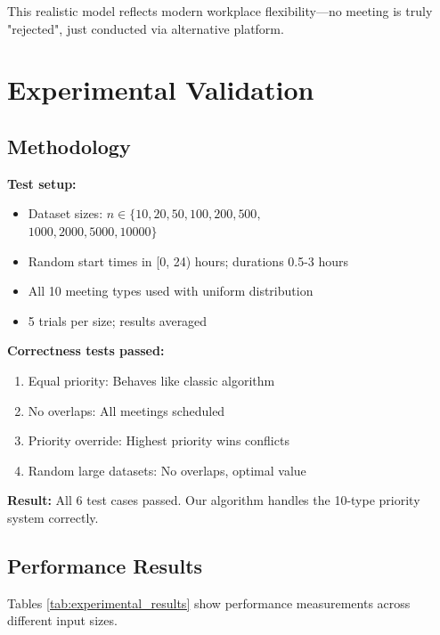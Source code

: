 \documentclass[conference]{IEEEtran}
\begin{document}
This realistic model reflects modern workplace flexibility—no meeting is truly "rejected", just conducted via alternative platform.

\section{Experimental Validation}

\subsection{Methodology}
\vspace{-1ex}

\textbf{Test setup:}
\begin{itemize}
    \item Dataset sizes: $n \in \{10, 20, 50, 100, 200, 500,$\\
        $1000, 2000, 5000, 10000\}$
    \item Random start times in [0, 24) hours; durations 0.5-3 hours
    \item All 10 meeting types used with uniform distribution
    \item 5 trials per size; results averaged
\end{itemize}

\textbf{Correctness tests passed:}
\begin{enumerate}
    \item Equal priority: Behaves like classic algorithm
    \item No overlaps: All meetings scheduled
    \item Priority override: Highest priority wins conflicts
    \item Random large datasets: No overlaps, optimal value
\end{enumerate}

\textbf{Result:} All 6 test cases passed. Our algorithm handles the 10-type priority system correctly.

\subsection{Performance Results}
\vspace{-1ex}

Tables \ref{tab:experimental_results} show performance measurements across different input sizes.
\end{document}

